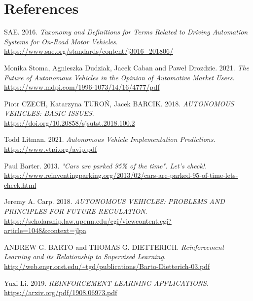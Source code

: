 \documentclass[14pt]{extarticle}
\begin{document}
\newpage
\section{References}
\begingroup
\renewcommand{\section}[2]{}
\begin{thebibliography}{999}
  SAE. 2016.
  \emph{Taxonomy and Definitions for Terms Related to Driving Automation Systems for On-Road Motor Vehicles}.\\
  \url{https://www.sae.org/standards/content/j3016_201806/}
   
  Monika Stoma, Agnieszka Dudziak, Jacek Caban and Paweł Drozdzie. 2021.
  \emph{The Future of Autonomous Vehicles in the Opinion of Automotive
Market Users}.\\
  \url{https://www.mdpi.com/1996-1073/14/16/4777/pdf}
   
  Piotr CZECH, Katarzyna TUROŃ, Jacek BARCIK. 2018.
  \emph{AUTONOMOUS VEHICLES: BASIC ISSUES}.\\
  \url{https://doi.org/10.20858/sjsutst.2018.100.2}
  
  Todd Litman. 2021.
  \emph{Autonomous Vehicle Implementation Predictions}.\\
  \url{https://www.vtpi.org/avip.pdf}
  
  Paul Barter. 2013.
  \emph{"Cars are parked 95\% of the time". Let's check!}.\\
  \url{https://www.reinventingparking.org/2013/02/cars-are-parked-95-of-time-lets-check.html}
  
  Jeremy A. Carp. 2018.
  \emph{AUTONOMOUS VEHICLES: PROBLEMS AND PRINCIPLES FOR FUTURE REGULATION}.\\
  \url{https://scholarship.law.upenn.edu/cgi/viewcontent.cgi?article=1048&context=jlpa}
 
  ANDREW G. BARTO and THOMAS G. DIETTERICH.
  \emph{Reinforcement Learning and its Relationship to Supervised Learning}.\\
  \url{http://web.engr.orst.edu/~tgd/publications/Barto-Dietterich-03.pdf}
  
  Yuxi Li. 2019.
  \emph{REINFORCEMENT LEARNING APPLICATIONS}.\\
  \url{https://arxiv.org/pdf/1908.06973.pdf}
  

\end{thebibliography}
\end{document}
